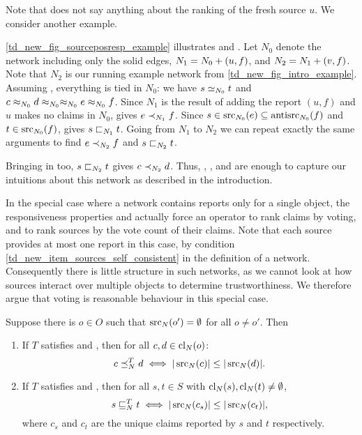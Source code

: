 Note that \sourceposresp{} does not say anything about the ranking of the fresh
source $u$. We consider another example.

\begin{example}
    \label{td_new_ex_posresps}
    \cref{td_new_fig_sourceposresp_example} illustrates \freshposresp{} and
    \sourceposresp{}. Let $N_0$ denote the network including only the solid
    edges, $N_1 = {N_0} + ({u}, {f})$, and $N_2 = {N_1} + ({v}, {f})$. Note
    that $N_2$ is our running example network from
    \cref{td_new_fig_intro_example}.
    Assuming \symmetry{}, everything is tied in $N_0$: we have $s \simeq_{N_0} t$
    and $c \approx_{N_0} d \approx_{N_0} \approx_{N_0} e \approx_{N_0} f$. Since $N_1$ is
    the result of adding the report $(u, f)$ and $u$ makes no claims in $N_0$,
    \freshposresp{} gives $e \prec_{N_1} f$. Since $s \in \operatorname{src}_{N_0}(e)
    \subseteq \operatorname{antisrc}_{N_0}(f)$ and $t \in \operatorname{src}_{N_0}(f)$, \sourceposresp{}
    gives $s \sqsubset_{N_1} t$. Going from $N_1$ to $N_2$ we can repeat exactly the
    same arguments to find $e \prec_{N_2} f$ and $s \sqsubset_{N_2} t$.

    Bringing \claimcoherence{} in too, $s \sqsubset_{N_2} t$ gives $c \prec_{N_2} d$.
    Thus, \claimcoherence{}, \symmetry{}, \freshposresp{} and \sourceposresp{}
    are enough to capture our intuitions about this network as described in the
    introduction.
\end{example}

In the special case where a network contains reports only for a single object,
the responsiveness properties and \symmetry{} actually force an operator to
rank claims by voting, and to rank sources by the vote count of their claims.
Note that each source provides at most one report in this case, by condition
\cref{td_new_item_sources_self_consistent} in the definition of a network.
Consequently there is little structure in such networks, as we cannot look at
how sources interact over multiple objects to determine trustworthiness. We
therefore argue that voting is reasonable behaviour in this special case.

\begin{proposition}
    \label{td_new_prop_symm_fpr_single_object_voting}
    Suppose there is $o \in O$ such that $\operatorname{src}_N(o') = \emptyset$ for all $o
    \ne o'$. Then
    \begin{enumerate}
        \item\label{td_new_item_prop_symm_fpr_single_object_voting_claims}
        If $T$ satisfies \symmetry{} and \freshposresp{}, then for all $c, d
            \in \operatorname{cl}_N(o)$:
        \[
            c \preceq_N^T d \iff |\operatorname{src}_N(c)| \le |\operatorname{src}_N(d)|.
        \]
        \item\label{td_new_item_prop_symm_fpr_single_object_voting_sources}
        If $T$ satisfies \symmetry{} and \sourceposresp{}, then for all $s, t
            \in S$ with $\operatorname{cl}_N(s), \operatorname{cl}_N(t) \ne \emptyset$,
        \[
            s \sqsubseteq_N^T t
            \iff
            |\operatorname{src}_N(c_s)| \le |\operatorname{src}_N(c_t)|,
        \]
        where $c_s$ and $c_t$ are the unique claims reported by $s$ and $t$
        respectively.
    \end{enumerate}
\end{proposition}

